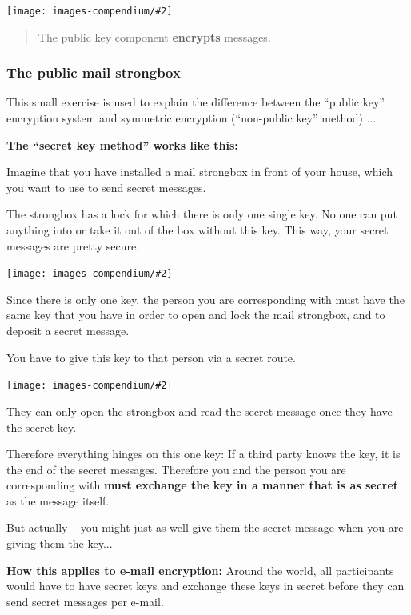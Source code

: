 \documentclass[a4paper,11pt,oneside,openright,titlepage]{scrbook}
\newcommand{\Email}{e-mail}
\newcommand{\IncludeImage}[2][]{
\begin{center}
  \texttt{[image: images-compendium/\#2]}%
\end{center}
}
\begin{document}
\IncludeImage[width=0.75\textwidth]{key-with-shadow-bit}

\begin{quote}
    The public key component \textbf{encrypts} messages.
\end{quote}


\clearpage
\subsubsection{The public mail strongbox}

This small exercise is used to explain the difference between the
``public key'' encryption system and symmetric
encryption (``non-public key''
method)
 ...

\bigskip

\textbf{The ``secret key method'' works like this:}

Imagine that you have installed a mail strongbox in front of your
house, which you want to use to send secret messages.

The strongbox has a lock for which there is only one single key. No
one can put anything into or take it out of the box without this key.
This way, your secret messages are pretty secure.


\IncludeImage[width=0.75\textwidth]{letter-into-safe}

Since there is only one key, the person you are corresponding with
must have the same key that you have in order to open and lock the mail
strongbox, and to deposit a secret message.

\clearpage
You have to give this key to that person via a secret route.

\bigskip
\bigskip


\IncludeImage[width=0.75\textwidth]{secret-key-exchange}

\clearpage
They can only open the strongbox and read the secret message once they
have the secret key.

Therefore everything hinges on this one key: If a third party knows
the key, it is the end of the secret messages.  Therefore you and the
person you are corresponding with \textbf{must exchange the key in a
manner that is as secret} as the message itself.

But actually -- you might just as well give them the secret message
when you are giving them the key...

\textbf{How this applies to \Email{} encryption:} Around the world,
all participants would have to have secret keys and exchange
these keys in secret before they can send secret messages
per \Email{}.
\end{document}
